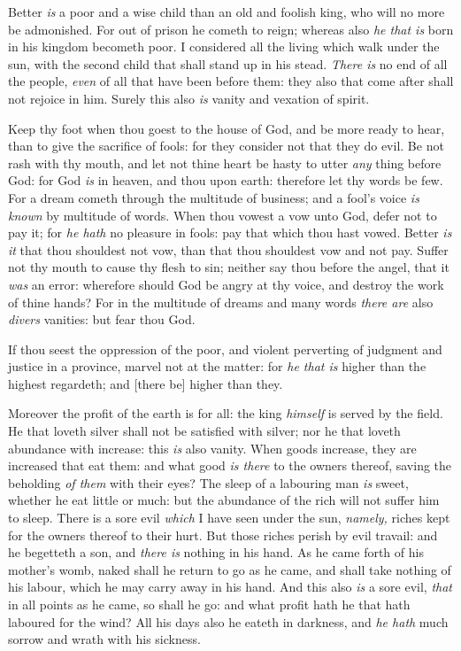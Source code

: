 \documentclass[11pt,letterpaper,oneside]{memoir}
\begin{document}
Better \emph{is} a poor and a wise child than an old and foolish king, 
who will no more be admonished. For out of prison he cometh to reign; 
whereas also \emph{he that is} born in his kingdom becometh poor. I 
considered all the living which walk under the sun, with the second 
child that shall stand up in his stead. \emph{There is} no end of all 
the people, \emph{even} of all that have been before them: they also 
that come after shall not rejoice in him. Surely this also \emph{is} 
vanity and vexation of spirit. 

Keep thy foot when thou goest to the house of God, and be more ready to 
hear, than to give the sacrifice of fools: for they consider not that 
they do evil. Be not rash with thy mouth, and let not thine heart be 
hasty to utter \emph{any} thing before God: for God \emph{is} in heaven, 
and thou upon earth: therefore let thy words be few. For a dream cometh 
through the multitude of business; and a fool's voice \emph{is known} by 
multitude of words. When thou vowest a vow unto God, defer not to pay 
it; for \emph{he hath} no pleasure in fools: pay that which thou hast 
vowed. Better \emph{is it} that thou shouldest not vow, than that thou 
shouldest vow and not pay. Suffer not thy mouth to cause thy flesh to 
sin; neither say thou before the angel, that it \emph{was} an error: 
wherefore should God be angry at thy voice, and destroy the work of 
thine hands? For in the multitude of dreams and many words \emph{there 
are} also \emph{divers} vanities: but fear thou God. 

If thou seest the oppression of the poor, and violent perverting of 
judgment and justice in a province, marvel not at the matter: for 
\emph{he that is} higher than the highest regardeth; and [there be] 
higher than they. 

Moreover the profit of the earth is for all: the king \emph{himself} is 
served by the field. He that loveth silver shall not be satisfied with 
silver; nor he that loveth abundance with increase: this \emph{is} also 
vanity. When goods increase, they are increased that eat them: and what 
good \emph{is there} to the owners thereof, saving the beholding 
\emph{of them} with their eyes? The sleep of a labouring man \emph{is} 
sweet, whether he eat little or much: but the abundance of the rich will 
not suffer him to sleep. There is a sore evil \emph{which} I have seen 
under the sun, \emph{namely,} riches kept for the owners thereof to 
their hurt. But those riches perish by evil travail: and he begetteth a 
son, and \emph{there is} nothing in his hand. As he came forth of his 
mother's womb, naked shall he return to go as he came, and shall take 
nothing of his labour, which he may carry away in his hand. And this 
also \emph{is} a sore evil, \emph{that} in all points as he came, so 
shall he go: and what profit hath he that hath laboured for the wind? 
All his days also he eateth in darkness, and \emph{he hath} much sorrow 
and wrath with his sickness. 
\end{document}
